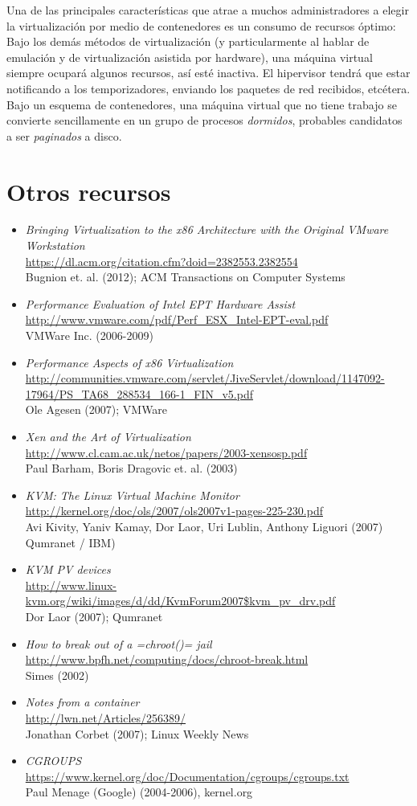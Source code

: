 \documentclass[11pt,fleqn]{book} %
\newcommand{\otrorec}[1]{ \\ {\small \url{#1}} \\ }
\begin{document}
Una de las principales características que atrae a muchos
administradores a elegir la virtualización por medio de contenedores
es un consumo de recursos óptimo: Bajo los demás métodos de
virtualización (y particularmente al hablar de emulación y de
virtualización asistida por hardware), una máquina virtual siempre
ocupará algunos recursos, así esté inactiva. El hipervisor tendrá que
estar notificando a los temporizadores, enviando los paquetes de red
recibidos, etcétera. Bajo un esquema de contenedores, una máquina
virtual que no tiene trabajo se convierte sencillamente en un grupo
de procesos \emph{dormidos}, probables candidatos a ser \emph{paginados} a
disco.
\section{Otros recursos}
\label{sec-9-6}


\begin{itemize}
\item \emph{Bringing Virtualization to the x86 Architecture with the Original   VMware Workstation}
  \otrorec{https://dl.acm.org/citation.cfm?doid=2382553.2382554}
  Bugnion et. al. (2012); ACM Transactions on Computer Systems
\item \emph{Performance Evaluation of Intel EPT Hardware Assist}
  \otrorec{http://www.vmware.com/pdf/Perf_ESX_Intel-EPT-eval.pdf}
  VMWare Inc. (2006-2009)
\item \emph{Performance Aspects of x86 Virtualization}
  \otrorec{http://communities.vmware.com/servlet/JiveServlet/download/1147092-17964/PS_TA68_288534_166-1_FIN_v5.pdf}
  Ole Agesen (2007); VMWare
\item \emph{Xen and the Art of Virtualization}
  \otrorec{http://www.cl.cam.ac.uk/netos/papers/2003-xensosp.pdf}
  Paul Barham, Boris Dragovic et. al. (2003)
\item \emph{KVM: The Linux Virtual Machine Monitor}
  \otrorec{http://kernel.org/doc/ols/2007/ols2007v1-pages-225-230.pdf}
  Avi Kivity, Yaniv Kamay, Dor Laor, Uri Lublin, Anthony Liguori (2007)
  Qumranet / IBM)
\item \emph{KVM PV devices}
  \otrorec{http://www.linux-kvm.org/wiki/images/d/dd/KvmForum2007$kvm_pv_drv.pdf}
  Dor Laor (2007); Qumranet
\item \emph{How to break out of a =chroot()= jail}
  \otrorec{http://www.bpfh.net/computing/docs/chroot-break.html}
  Simes (2002)
\item \emph{Notes from a container}
  \otrorec{http://lwn.net/Articles/256389/}
  Jonathan Corbet (2007); Linux Weekly News
\item \emph{CGROUPS}
  \otrorec{https://www.kernel.org/doc/Documentation/cgroups/cgroups.txt}
  Paul Menage (Google) (2004-2006), kernel.org
\end{itemize}
\end{document}
